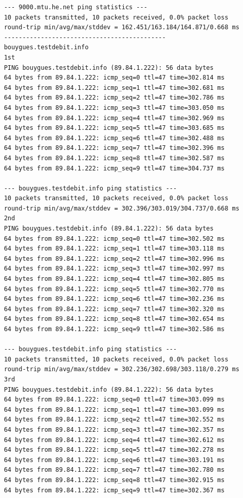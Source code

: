 \documentclass[paper=a4, fontsize=10pt]{scrartcl} %
\numberwithin{equation}{section} %
\numberwithin{figure}{section} %
\numberwithin{table}{section} %
\begin{document}
\begin{lstlisting}
    --- 9000.mtu.he.net ping statistics ---
    10 packets transmitted, 10 packets received, 0.0% packet loss
    round-trip min/avg/max/stddev = 162.451/163.184/164.871/0.668 ms
    --------------------------------------------
    bouygues.testdebit.info
    1st
    PING bouygues.testdebit.info (89.84.1.222): 56 data bytes
    64 bytes from 89.84.1.222: icmp_seq=0 ttl=47 time=302.814 ms
    64 bytes from 89.84.1.222: icmp_seq=1 ttl=47 time=302.681 ms
    64 bytes from 89.84.1.222: icmp_seq=2 ttl=47 time=302.786 ms
    64 bytes from 89.84.1.222: icmp_seq=3 ttl=47 time=303.050 ms
    64 bytes from 89.84.1.222: icmp_seq=4 ttl=47 time=302.969 ms
    64 bytes from 89.84.1.222: icmp_seq=5 ttl=47 time=303.685 ms
    64 bytes from 89.84.1.222: icmp_seq=6 ttl=47 time=302.488 ms
    64 bytes from 89.84.1.222: icmp_seq=7 ttl=47 time=302.396 ms
    64 bytes from 89.84.1.222: icmp_seq=8 ttl=47 time=302.587 ms
    64 bytes from 89.84.1.222: icmp_seq=9 ttl=47 time=304.737 ms
    
    --- bouygues.testdebit.info ping statistics ---
    10 packets transmitted, 10 packets received, 0.0% packet loss
    round-trip min/avg/max/stddev = 302.396/303.019/304.737/0.668 ms
    2nd
    PING bouygues.testdebit.info (89.84.1.222): 56 data bytes
    64 bytes from 89.84.1.222: icmp_seq=0 ttl=47 time=302.502 ms
    64 bytes from 89.84.1.222: icmp_seq=1 ttl=47 time=303.118 ms
    64 bytes from 89.84.1.222: icmp_seq=2 ttl=47 time=302.996 ms
    64 bytes from 89.84.1.222: icmp_seq=3 ttl=47 time=302.997 ms
    64 bytes from 89.84.1.222: icmp_seq=4 ttl=47 time=302.805 ms
    64 bytes from 89.84.1.222: icmp_seq=5 ttl=47 time=302.770 ms
    64 bytes from 89.84.1.222: icmp_seq=6 ttl=47 time=302.236 ms
    64 bytes from 89.84.1.222: icmp_seq=7 ttl=47 time=302.320 ms
    64 bytes from 89.84.1.222: icmp_seq=8 ttl=47 time=302.654 ms
    64 bytes from 89.84.1.222: icmp_seq=9 ttl=47 time=302.586 ms
    
    --- bouygues.testdebit.info ping statistics ---
    10 packets transmitted, 10 packets received, 0.0% packet loss
    round-trip min/avg/max/stddev = 302.236/302.698/303.118/0.279 ms
    3rd
    PING bouygues.testdebit.info (89.84.1.222): 56 data bytes
    64 bytes from 89.84.1.222: icmp_seq=0 ttl=47 time=303.099 ms
    64 bytes from 89.84.1.222: icmp_seq=1 ttl=47 time=303.099 ms
    64 bytes from 89.84.1.222: icmp_seq=2 ttl=47 time=302.552 ms
    64 bytes from 89.84.1.222: icmp_seq=3 ttl=47 time=302.357 ms
    64 bytes from 89.84.1.222: icmp_seq=4 ttl=47 time=302.612 ms
    64 bytes from 89.84.1.222: icmp_seq=5 ttl=47 time=302.278 ms
    64 bytes from 89.84.1.222: icmp_seq=6 ttl=47 time=303.191 ms
    64 bytes from 89.84.1.222: icmp_seq=7 ttl=47 time=302.780 ms
    64 bytes from 89.84.1.222: icmp_seq=8 ttl=47 time=302.915 ms
    64 bytes from 89.84.1.222: icmp_seq=9 ttl=47 time=302.367 ms
    

\end{lstlisting}
\end{document}
